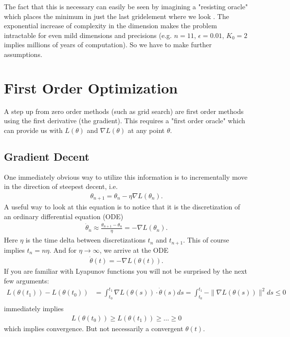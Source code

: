 The fact that this is necessary can easily be seen by imagining a "resisting
oracle" which places the minimum in just the last gridelement where we look
\parencite[cf.][p. 13]{nesterovLecturesConvexOptimization2018}. The exponential
increase of complexity in the dimension makes the problem intractable for even
mild dimensions and precisions (e.g. \(n=11\), \(\epsilon=0.01\), \(K_0=2\)
implies millions of years of computation). So we have to make further
assumptions. 

\section{First Order Optimization}

A step up from zero order methods (such as grid search) are first order methods
using the first derivative (the gradient). This requires a "first order oracle"
which can provide us with \(L(\theta)\) and \(\nabla L(\theta)\) at any point
\(\theta\).

\subsection{Gradient Decent}

One immediately obvious way to utilize this information is to
incrementally move in the direction of steepest decent, i.e.
%
\begin{align*}
	\theta_{n+1} = \theta_n - \eta\nabla L(\theta_n).
\end{align*}
%
A useful way to look at this equation is to notice that it is the
discretization of an ordinary differential equation (ODE)
%
\begin{align*}
	\dot{\theta}_n \approx \frac{\theta_{n+1} - \theta_n}{\eta}
	= - \nabla L(\theta_n).
\end{align*}
%
Here \(\eta\) is the time delta between discretizations \(t_n\) and \(t_{n+1}\).
This of course implies \(t_n = n\eta\). And for \(\eta\to\infty\), we arrive
at the ODE
%
\begin{align*}
	\dot{\theta}(t) = -\nabla L(\theta(t)).
\end{align*}
%
If you are familiar with Lyapunov functions you will not be surprised by the next
few arguments:
%
\begin{align*}
	L(\theta(t_1)) - L(\theta(t_0))
	&= \int_{t_0}^{t_1} \nabla L(\theta(s)) \cdot \dot{\theta}(s) ds
	= \int_{t_0}^{t_1} -\|\nabla L(\theta(s))\|^2 ds
	\le 0\\
\end{align*}
%
immediately implies
\begin{align*}
	L(\theta(t_0)) \ge L(\theta(t_1)) \ge \dots \ge 0
\end{align*}
which implies convergence. But not necessarily a convergent \(\theta(t)\).

